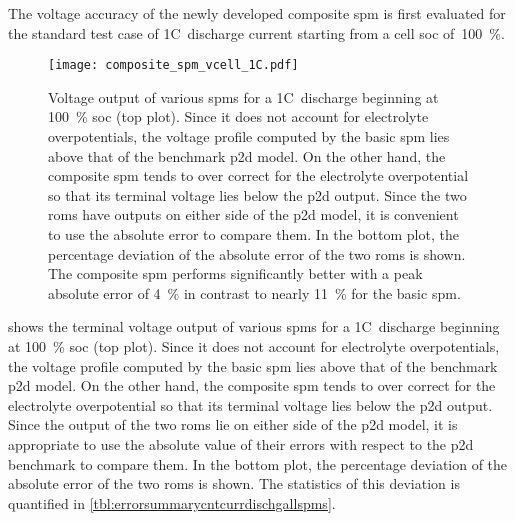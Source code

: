 The  voltage  accuracy of  the  newly  developed  composite \gls{spm}  is  first
evaluated for  the standard test  case of 1C~discharge current starting  from a
cell \gls{soc} of~\SI{100}{\percent}.

\begin{figure}[!htbp]
    \centering
    \texttt{[image: composite\_spm\_vcell\_1C.pdf]}
    \caption[%
    Comparison  of  terminal  voltages  of  composite  ,  basic
     and the  model for a 1C~discharge
    ]%
    {%
        Voltage output  of various \glspl{spm}  for a 1C~discharge  beginning at
        \SI{100}{\percent} \gls{soc} (top  plot). Since it does  not account for
        electrolyte overpotentials,  the voltage  profile computed by  the basic
        \gls{spm} lies above that of the benchmark \gls{p2d} model. On the other
        hand, the composite \gls{spm} tends  to over correct for the electrolyte
        overpotential  so that  its terminal  voltage lies  below the  \gls{p2d}
        output. Since  the two \glspl{rom}  have outputs  on either side  of the
        \gls{p2d}  model,  it  is  convenient  to  use  the  absolute  error  to
        compare  them. In  the  bottom  plot, the  percentage  deviation of  the
        absolute error of the two  \glspl{rom} is shown. The composite \gls{spm}
        performs  significantly better  with a  peak absolute  error of  \approx
        \SI{4}{\percent} in  contrast to nearly \SI{11}{\percent}  for the basic
        \gls{spm}.
    }%
    \label{fig:voltageoutputcompareallSPMs1C}
\end{figure}

  shows the  terminal voltage  output of
various \glspl{spm} for a 1C~discharge beginning at \SI{100}{\percent} \gls{soc}
(top  plot). Since  it  does  not account  for  electrolyte overpotentials,  the
voltage profile computed by the basic \gls{spm} lies above that of the benchmark
\gls{p2d}  model. On  the  other hand,  the composite  \gls{spm}  tends to  over
correct  for the  electrolyte overpotential  so that  its terminal  voltage lies
below  the \gls{p2d}  output. Since  the output  of the  two \glspl{rom}  lie on
either side of the \gls{p2d} model, it  is appropriate to use the absolute value
of their errors with respect to the  \gls{p2d} benchmark to compare them. In the
bottom  plot,  the  percentage  deviation  of the  absolute  error  of  the  two
\glspl{rom} is shown. The statistics of this deviation is quantified
in \cref{tbl:errorsummarycntcurrdischgallspms}.

